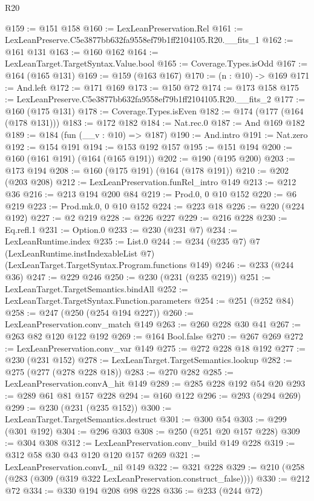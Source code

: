 \begin{lexlean}{R20}
\begin{coremodule}
@159 := @151 @158
@160 := LexLeanPreservation.Rel
@161 := LexLeanPreserve.C5e3877bb632fa9558ef79b1ff2104105.R20.__fits_1
@162 := @161 @131
@163 := @160 @162
@164 := LexLeanTarget.TargetSyntax.Value.bool
@165 := Coverage.Types.isOdd
@167 := @164 (@165 @131)
@169 := @159 (@163 @167)
@170 := (n : @10) -> @169
@171 := And.left
@172 := @171 @169
@173 := @150 @72
@174 := @173 @158
@175 := LexLeanPreserve.C5e3877bb632fa9558ef79b1ff2104105.R20.__fits_2
@177 := @160 (@175 @131)
@178 := Coverage.Types.isEven
@182 := @174 (@177 (@164 (@178 @131)))
@183 := @172 @182
@184 := Nat.rec.{0}
@187 := And @169 @182
@189 := @184 (fun (__v : @10) => @187)
@190 := And.intro
@191 := Nat.zero
@192 := @154 @191
@194 := @153 @192 @157
@195 := @151 @194
@200 := @160 (@161 @191) (@164 (@165 @191))
@202 := @190 (@195 @200)
@203 := @173 @194
@208 := @160 (@175 @191) (@164 (@178 @191))
@210 := @202 (@203 @208)
@212 := LexLeanPreservation.funRel_intro @149
@213 := @212 @36
@216 := @213 @194 @200 @84
@219 := Prod.{0, 0} @10 @152
@220 := @6 @219
@223 := Prod.mk.{0, 0} @10 @152
@224 := @223 @18
@226 := @220 (@224 @192)
@227 := @2 @219
@228 := @226 @227
@229 := @216 @228
@230 := Eq.refl.{1}
@231 := Option.{0}
@233 := @230 (@231 @7)
@234 := LexLeanRuntime.index
@235 := List.{0}
@244 := @234
    (@235 @7)
    @7
    (LexLeanRuntime.instIndexableList @7)
    (LexLeanTarget.TargetSyntax.Program.functions @149)
@246 := @233 (@244 @36)
@247 := @229 @246
@250 := @230 (@231 (@235 @219))
@251 := LexLeanTarget.TargetSemantics.bindAll
@252 := LexLeanTarget.TargetSyntax.Function.parameters
@254 := @251 (@252 @84)
@258 := @247 (@250 (@254 @194 @227))
@260 := LexLeanPreservation.conv_match @149
@263 := @260 @228 @30 @41
@267 := @263 @82 @120 @122 @192
@269 := @164 Bool.false
@270 := @267 @269
@272 := LexLeanPreservation.conv_var @149
@275 := @272 @228 @18 @192
@277 := @230 (@231 @152)
@278 := LexLeanTarget.TargetSemantics.lookup
@282 := @275 (@277 (@278 @228 @18))
@283 := @270 @282
@285 := LexLeanPreservation.convA_hit @149
@289 := @285 @228 @192 @54 @20
@293 := @289 @61 @81 @157 @228
@294 := @160 @122
@296 := @293 (@294 @269)
@299 := @230 (@231 (@235 @152))
@300 := LexLeanTarget.TargetSemantics.destruct
@301 := @300 @54
@303 := @299 (@301 @192)
@304 := @296 @303
@308 := @250 (@251 @20 @157 @228)
@309 := @304 @308
@312 := LexLeanPreservation.conv_build @149 @228
@319 := @312 @58 @30 @43 @120 @120 @157 @269
@321 := LexLeanPreservation.convL_nil @149
@322 := @321 @228
@329 := @210 (@258 (@283 (@309 (@319 @322 LexLeanPreservation.construct_false))))
@330 := @212 @72
@334 := @330 @194 @208 @98 @228
@336 := @233 (@244 @72)

\end{coremodule}
\end{lexlean}
